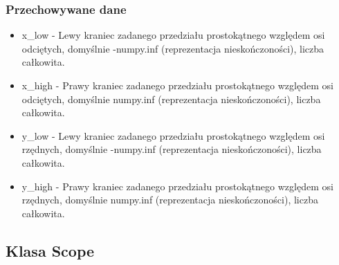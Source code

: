 \documentclass{article}
\begin{document}
            \subsubsection{Przechowywane dane}
            \begin{itemize}
                \item x\_low - Lewy kraniec zadanego przedziału prostokątnego względem osi odciętych, domyślnie -numpy.inf (reprezentacja nieskończoności), liczba całkowita. 
                
                \item x\_high - Prawy kraniec zadanego przedziału prostokątnego względem osi odciętych, domyślnie numpy.inf (reprezentacja nieskończoności), liczba całkowita. 
                
                \item y\_low - Lewy kraniec zadanego przedziału prostokątnego względem osi rzędnych, domyślnie -numpy.inf (reprezentacja nieskończoności), liczba całkowita. 
                
                \item y\_high - Prawy kraniec zadanego przedziału prostokątnego względem osi rzędnych, domyślnie numpy.inf (reprezentacja nieskończoności), liczba całkowita. 
            \end{itemize}
        
        \subsection{Klasa Scope}
\end{document}
